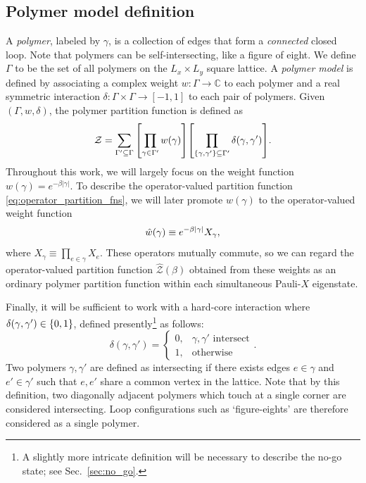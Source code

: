 \subsection{Polymer model definition}
A \emph{polymer}, labeled by $\gamma$, is a collection of edges that form a \emph{connected} closed loop. Note that polymers can be self-intersecting, like a figure of eight. We define $\Gamma$ to be the set of all polymers on the $L_x \times L_y$ square lattice. A \emph{polymer model} is defined by associating a complex weight $w: \Gamma \to \mathbb{C}$ to each polymer and a real symmetric interaction $\delta: \Gamma \times \Gamma \to [-1, 1]$ to each pair of polymers. Given $(\Gamma, w,\delta)$, the polymer partition function is defined as 
\begin{equation}
    \mathcal{Z} = \sum_{\Gamma'\subseteq \Gamma} \qty[ \prod_{\gamma \in \Gamma'} w(\gamma) ]  \qty[ \prod_{\left\{ \gamma,\gamma' \right\} \subseteq \Gamma'} \delta(\gamma, \gamma') ] .
    \label{eqn:PolymerPartitionFunction}
\end{equation}
Throughout this work, we will largely focus on the weight function $w(\gamma) = e^{-\beta |\gamma|}$. To describe the operator-valued partition function \eqref{eq:operator_partition_fns}, we will later promote $w(\gamma)$ to the operator-valued weight function
\begin{equation}
\label{eq:app_operator_weights}
    \hat{w}(\gamma) \equiv e^{-\beta \abs{\gamma}} X_\gamma ,
\end{equation}
where $X_{\gamma} \equiv \prod_{e \in \gamma} X_e$. These operators mutually commute, so we can regard the operator-valued partition function $\hat{\mathcal{Z}}(\beta)$ obtained from these weights as an ordinary polymer partition function within each simultaneous Pauli-$X$ eigenstate.

Finally, it will be sufficient to work with a hard-core interaction where $\delta(\gamma, \gamma') \in \left\{ 0,1 \right\}$, defined presently\footnote{A slightly more intricate definition will be necessary to describe the no-go state; see Sec.~\ref{sec:no_go}.} as follows:
\begin{equation}
\label{eq:app_delta_fn}
    \delta(\gamma, \gamma') = \begin{cases}
        0, & \gamma, \gamma' \text{ intersect} \\
        1, & \text{otherwise}
    \end{cases} .
\end{equation}
Two polymers $\gamma, \gamma'$ are defined as intersecting if there exists edges $e \in \gamma$ and $e' \in \gamma'$ such that $e, e'$ share a common vertex in the lattice. Note that by this definition, two diagonally adjacent polymers which touch at a single corner are considered intersecting. Loop configurations such as `figure-eights' are therefore considered as a single polymer.

